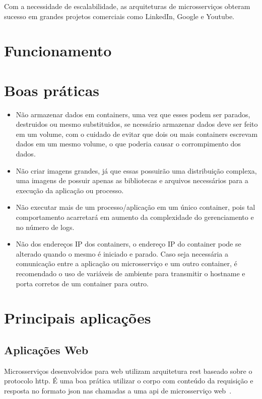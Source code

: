 Com a necessidade de escalabilidade, as arquiteturas de microsserviços obteram sucesso em grandes projetos comerciais como LinkedIn, Google e Youtube.

\section{Funcionamento}

\section{Boas práticas}
\begin{itemize}
	\item Não armazenar dados em containers, uma vez que esses podem ser parados, destruidos ou mesmo substituidos, se ncessário armazenar dados deve ser feito em um volume, com o cuidado de evitar que dois ou mais containers escrevam dados em um mesmo volume, o que poderia causar o corrompimento dos dados.
	\item Não criar imagens grandes, já que essas possuirão uma distribuição complexa, uma imagens de possuir apenas as bibliotecas e arquivos necessários para a execução da aplicação ou processo.
	\item Não executar mais de um processo/aplicação em um único container, pois tal comportamento acarretará em aumento da complexidade do gerenciamento e no número de logs.
	\item Não dos endereços IP dos containers, o endereço IP do container pode se alterado quando o mesmo é iniciado e parado. Caso seja necessária a comunicação entre a aplicação ou microsserviço e um outro container, é recomendado o uso de variáveis de ambiente para transmitir o hostname e porta corretos de um container para outro.
\end{itemize}



\section{Principais aplicações}

\subsection{Aplicações Web}

Microsserviços desenvolvidos para web utilizam arquitetura \ac{rest} baseado sobre o protocolo \ac{http}.
É uma boa prática utilizar o corpo com conteúdo da requisição e resposta no formato \ac{json} nas chamadas a uma \ac{api} de microsserviço web~\cite{Nadareishvili2016Aug}.

